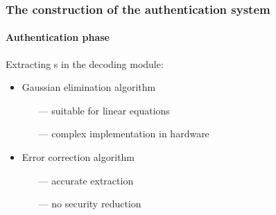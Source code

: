 \documentclass{beamer}
\begin{document}
\begin{frame}
	\frametitle{The construction of the authentication system}
	\framesubtitle{Authentication phase}
	{\Large	Extracting s in the decoding module:}\\
	\vspace{0.5cm}
	\begin{itemize}
		\item Gaussian elimination algorithm 	
		\begin{itemize}
			\item [---] suitable for linear equations
			\item [---] complex implementation in hardware
		\end{itemize}
	
	\end{itemize}
	\begin{itemize}
		\item Error correction algorithm
		\begin{itemize}
			\item [---] accurate extraction 
			\item [---] no security reduction
		\end{itemize}
	\end{itemize}
\end{frame}
\end{document}
